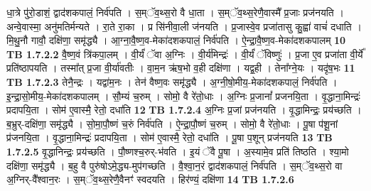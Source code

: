 \documentclass[17pt]{extarticle}
\begin{document}
                  धा॒त्रे पु॑रो॒डाशं॒ द्वाद॑शकपालं॒ निर्व॑पति । स॒म्ॅव॒थ्स॒रो वै धा॒ता । स॒म्ॅव॒थ्स॒रेणै॒वास्मै᳚ प्र॒जाः प्रज॑नयति । अन्वे॒वास्मा॒ अनु॑मतिर्मन्यते । रा॒ते रा॒का । प्र सि॑नीवा॒ली ज॑नयति । प्र॒जास्वे॒व प्रजा॑तासु कु॒ह्वा॑ वाचं॑ दधाति । मि॒थु॒नौ गावौ॒ दक्षि॑णा॒ समृ॑द्ध्यै । आ॒ग्ना॒वै॒ष्ण॒व-मेका॑दशकपालं॒ निर्व॑पति । ऐ॒न्द्रा॒वै॒ष्ण॒व-मेका॑दशकपालम् \textbf{ 10} \newline
                  \newline
                                \textbf{ TB 1.7.2.2} \newline
                  वै॒ष्ण॒वं त्रि॑कपा॒लम् । वी॒र्यं॑ ॅवा अ॒ग्निः । वी॒र्य॑मिन्द्रः॑ । वी॒र्यं॑ ॅविष्णुः॑ । प्र॒जा ए॒व प्रजा॑ता वी॒र्ये᳚ प्रति॑ष्ठापयति । तस्मा᳚त् प्र॒जा वी॒र्या॑वतीः । वा॒म॒न ऋ॑ष॒भो व॒ही दक्षि॑णा । यद्व॒ही । तेना᳚ग्ने॒यः । यदृ॑ष॒भः \textbf{ 11} \newline
                  \newline
                                \textbf{ TB 1.7.2.3} \newline
                  तेनै॒न्द्रः । यद्वा॑म॒नः । तेन॑ वैष्ण॒वः समृ॑द्ध्यै । अ॒ग्नी॒षो॒मीय॒-मेका॑दशकपालं॒ निर्व॑पति । इ॒न्द्रा॒सो॒मीय॒-मेका॑दशकपालम् । सौ॒म्यं च॒रुम् । सोमो॒ वै रे॑तो॒धाः । अ॒ग्निः प्र॒जानां᳚ प्रजनयि॒ता । वृ॒द्धाना॒मिन्द्रः॑ प्रदापयि॒ता । सोम॑ ए॒वास्मै॒ रेतो॒ दधा॑ति \textbf{ 12} \newline
                  \newline
                                \textbf{ TB 1.7.2.4} \newline
                  अ॒ग्निः प्र॒जां प्रज॑नयति । वृ॒द्धामिन्द्रः॒ प्रय॑च्छति । ब॒भ्रुर्-दक्षि॑णा॒ समृ॑द्ध्यै । सो॒मा॒पौ॒ष्णं च॒रुं निर्व॑पति । ऐ॒न्द्रा॒पौ॒ष्णं च॒रुम् । सोमो॒ वै रे॑तो॒धाः । पू॒षा प॑शू॒नां प्र॑जनयि॒ता । वृ॒द्धाना॒मिन्द्रः॑ प्रदापयि॒ता । सोम॑ ए॒वास्मै॒ रेतो॒ दधा॑ति । पू॒षा प॒शून् प्रज॑नयति \textbf{ 13} \newline
                  \newline
                                \textbf{ TB 1.7.2.5} \newline
                  वृ॒द्धानिन्द्रः॒ प्रय॑च्छति । पौ॒ष्णश्च॒रुर्-भ॑वति । इ॒यं ॅवै पू॒षा । अ॒स्यामे॒व प्रति॑ तिष्ठति । श्या॒मो दक्षि॑णा॒ समृ॑द्ध्यै । ब॒हु वै पुरु॑षोऽमे॒द्ध्य-मुप॑गच्छति । वै॒श्वा॒न॒रं द्वाद॑शकपालं॒ निर्व॑पति । स॒म्ॅव॒थ्स॒रो वा अ॒ग्निर्-वै᳚श्वान॒रः । स॒म्ॅव॒थ्स॒रेणै॒वैनꣳ॑ स्वदयति । हिर॑ण्यं॒ दक्षि॑णा \textbf{ 14} \newline
                  \newline
                                \textbf{ TB 1.7.2.6} \newline
\end{document}
